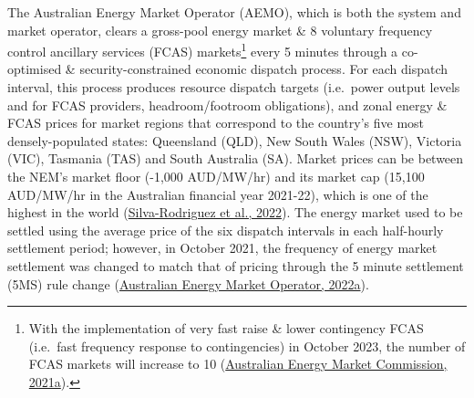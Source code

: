 \documentclass[12pt,a4paper,]{report}
\begin{document}
The Australian Energy Market Operator (AEMO), which is both the system
and market operator, clears a gross-pool energy market \& 8 voluntary
frequency control ancillary services (FCAS) markets\footnote{With the
  implementation of very fast raise \& lower contingency FCAS (i.e.~fast
  frequency response to contingencies) in October 2023, the number of
  FCAS markets will increase to 10
  (\protect\hyperlink{ref-australianenergymarketcommissionFastFrequencyResponse2021}{Australian
  Energy Market Commission, 2021a}).} every 5 minutes through a
co-optimised \& security-constrained economic dispatch process. For each
dispatch interval, this process produces resource dispatch targets
(i.e.~power output levels and for FCAS providers, headroom/footroom
obligations), and zonal energy \& FCAS prices for market regions that
correspond to the country's five most densely-populated states:
Queensland (QLD), New South Wales (NSW), Victoria (VIC), Tasmania (TAS)
and South Australia (SA). Market prices can be between the NEM's market
floor (-1,000 AUD/MW/hr) and its market cap (15,100 AUD/MW/hr in the
Australian financial year 2021-22), which is one of the highest in the
world
(\protect\hyperlink{ref-silva-rodriguezShortTermWholesale2022}{Silva-Rodriguez
et al., 2022}). The energy market used to be settled using the average
price of the six dispatch intervals in each half-hourly settlement
period; however, in October 2021, the frequency of energy market
settlement was changed to match that of pricing through the 5 minute
settlement (5MS) rule change
(\protect\hyperlink{ref-australianenergymarketoperator5MSCommencement2022}{Australian
Energy Market Operator, 2022a}).
\end{document}

